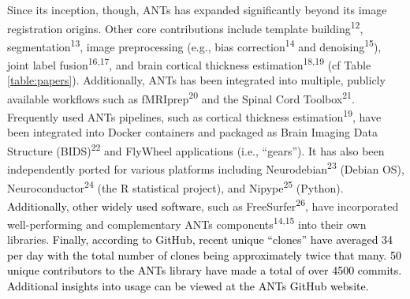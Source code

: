 \documentclass[12pt,]{article}
\begin{document}
Since its inception, though, ANTs has expanded significantly beyond its
image registration origins. Other core contributions include template
building\textsuperscript{12}, segmentation\textsuperscript{13}, image
preprocessing (e.g., bias correction\textsuperscript{14} and
denoising\textsuperscript{15}), joint label
fusion\textsuperscript{16,17}, and brain cortical thickness
estimation\textsuperscript{18,19} (cf Table \ref{table:papers}).
Additionally, ANTs has been integrated into multiple, publicly available
workflows such as fMRIprep\textsuperscript{20} and the Spinal Cord
Toolbox\textsuperscript{21}. Frequently used ANTs pipelines, such as
cortical thickness estimation\textsuperscript{19}, have been integrated
into Docker containers and packaged as Brain Imaging Data Structure
(BIDS)\textsuperscript{22} and FlyWheel applications (i.e., ``gears'').
It has also been independently ported for various platforms including
Neurodebian\textsuperscript{23} (Debian OS),
Neuroconductor\textsuperscript{24} (the R statistical project), and
Nipype\textsuperscript{25} (Python).
\textcolor{black}{Additionally, other widely
used software}, such as FreeSurfer\textsuperscript{26}, have
incorporated well-performing and complementary ANTs
components\textsuperscript{14,15} into their own libraries.
\textcolor{black}{Finally, according to GitHub, recent
unique “clones” have averaged 34 per day with the total number of clones being
approximately twice that many.  50 unique contributors to the ANTs library have
made a total of over 4500 commits. Additional insights into usage can be viewed
at the ANTs GitHub website.}


\end{document}
